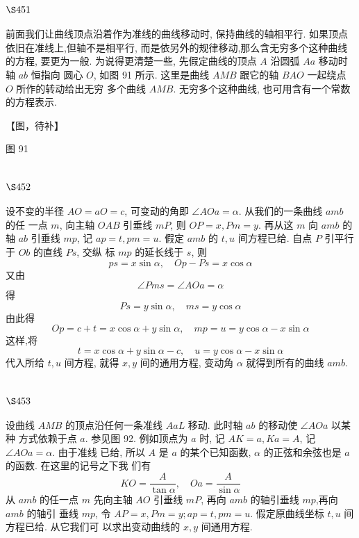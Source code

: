 \section{$\S 451$}

前面我们让曲线顶点沿着作为准线的曲线移动时, 保持曲线的轴相平行. 如果顶点 依旧在准线上,但轴不是相平行, 而是依另外的规律移动,那么含无穷多个这种曲线的方程, 要更为一般. 为说得更清楚一些, 先假定曲线的顶点 $A$ 沿圆弧 $A a$ 移动时轴 $a b$ 恒指向 圆心 $O$, 如图 91 所示. 这里是曲线 $A M B$ 跟它的轴 $B A O$ 一起绕点 $O$ 所作的转动给出无穷 多个曲线 $A M B$. 无穷多个这种曲线, 也可用含有一个常数的方程表示.


【图，待补】

图 91

\section{$\S 452$}

设不变的半径 $A O=a O=c$, 可变动的角即 $\angle A O a=\alpha$. 从我们的一条曲线 $a m b$ 的任 一点 $m$, 向主轴 $O A B$ 引垂线 $m P$, 则 $O P=x, P m=y$. 再从这 $m$ 向 $a m b$ 的轴 $a b$ 引垂线 $m p$, 记 $a p=t, p m=u$. 假定 $a m b$ 的 $t, u$ 间方程已给. 自点 $P$ 引平行于 $O b$ 的直线 $P s$, 交纵 标 $m p$ 的延长线于 $s$, 则
\[
p s=x \sin \alpha, \quad O p-P s=x \cos \alpha
\]
又由
\[
\angle P m s=\angle A O a=\alpha
\]
得
\[
P s=y \sin \alpha, \quad m s=y \cos \alpha
\]
由此得
\[
O p=c+t=x \cos \alpha+y \sin \alpha, \quad m p=u=y \cos \alpha-x \sin \alpha
\]
这样,将
\[
t=x \cos \alpha+y \sin \alpha-c, \quad u=y \cos \alpha-x \sin \alpha
\]
代入所给 $t, u$ 间方程, 就得 $x, y$ 间的通用方程, 变动角 $\alpha$ 就得到所有的曲线 $a m b$.

\section{$\S 453$}

设曲线 $A M B$ 的顶点沿任何一条准线 $A a L$ 移动. 此时轴 $a b$ 的移动使 $\angle A O a$ 以某种 方式依赖于点 $a$. 参见图 92. 例如顶点为 $a$ 时, 记 $A K=a, K a=A$, 记 $\angle A O a=\alpha$. 由于准线 已给, 所以 $A$ 是 $a$ 的某个已知函数, $\alpha$ 的正弦和余弦也是 $a$ 的函数. 在这里的记号之下我 们有 
\[
K O=\frac{A}{\tan \alpha}, \quad O a=\frac{A}{\sin \alpha}
\]
从 $a m b$ 的任一点 $m$ 先向主轴 $A O$ 引垂线 $m P$, 再向 $a m b$ 的轴引垂线 $m p$,再向 $a m b$ 的轴引 垂线 $m p$, 令 $A P=x, P m=y ; a p=t, p m=u$. 假定原曲线坐标 $t, u$ 间方程已给. 从它我们可 以求出变动曲线的 $x, y$ 间通用方程.


